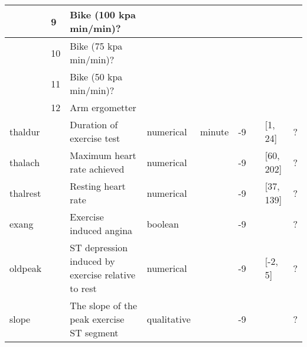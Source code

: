 \documentclass[a4paper,12pt]{article}
\begin{document}
\begin{adjustbox}{width=1\textwidth}
\begin{tabular}{|l|l|l|l|l|l|l|l|l|}
              & 9                  & Bike (100 kpa min/min)?                                    &              &                        &                      &                                       &               &              \\ \hline
              & 10                 & Bike (75 kpa min/min)?                                     &              &                        &                      &                                       &               &              \\ \hline
              & 11                 & Bike (50 kpa min/min)?                                     &              &                        &                      &                                       &               &              \\ \hline
              & 12                 & Arm ergometter                                             &              &                        &                      &                                       &               &              \\ \hline
thaldur       &                    & Duration of exercise test                                  & numerical    & minute                 & -9                   &                                       & [1, 24]       & ?            \\ \hline
thalach       &                    & Maximum heart rate achieved                                & numerical    &                        & -9                   &                                       & [60, 202]     & ?            \\ \hline
thalrest      &                    & Resting heart rate                                         & numerical    &                        & -9                   &                                       & [37, 139]     & ?            \\ \hline
exang         &                    & Exercise induced angina                                    & boolean      &                        & -9                   &                                       &               & ?            \\ \hline
oldpeak       &                    & ST depression induced  by exercise relative to rest        & numerical    &                        & -9                   &                                       & [-2, 5]       & ?            \\ \hline
slope         &                    & The slope of the peak exercise ST segment                  & qualitative  &                        & -9                   &                                       &               & ?            \\ \hline

\end{tabular}
\end{adjustbox}
\end{document}

